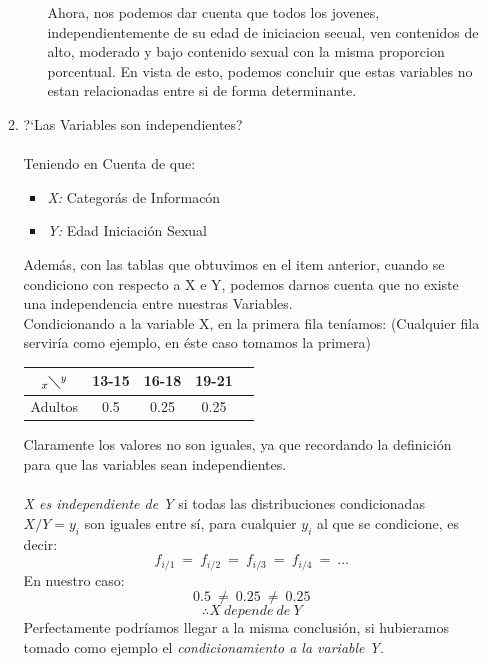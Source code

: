 \documentclass[letterpaper,spanish,11pt]{article}
\begin{document}
\begin{itemize}
\begin{enumerate}
\begin{enumerate}
Ahora, nos podemos dar cuenta que todos los jovenes, independientemente de su edad de iniciacion secual, ven contenidos de alto, moderado y bajo contenido sexual con la misma proporcion porcentual. En vista de esto, podemos concluir que estas variables no estan relacionadas entre si de forma determinante.\\ 

\end{enumerate}
\item ?`Las Variables son independientes?\\\\
	Teniendo en Cuenta de que:\\
	\begin{itemize}
		\item \emph{X:} Categor\'as de Informac\'on
		\item \emph{Y:} Edad Iniciaci\'on Sexual
	\end{itemize}
	Adem\'as, con las tablas que obtuvimos en el item anterior, cuando se condiciono con respecto a X e Y, podemos darnos
	cuenta que no existe una independencia entre nuestras Variables.\\
		Condicionando a la variable X, en la primera fila ten\'iamos: (Cualquier fila servir\'ia como ejemplo, en \'este caso tomamos la primera)\\
		\begin{center}
			\begin{tabular}[c]{|c|c c c|c|}                           	
	                \hline
	                $_x\diagdown ^{y}$ & 13-15 & 16-18 & 19-21 \\
		        \hline
	                Adultos & 0.5 & 0.25 & 0.25 \\
			\hline
	                \end{tabular}
		\end{center}
	Claramente los valores no son iguales, ya que recordando la definici\'on para que las variables sean independientes.\\\\
	\emph{X es independiente de Y} si todas las distribuciones condicionadas $X/Y = y_{i}$ son iguales
	entre s\'i, para cualquier $y_{i}$ al que se condicione, es decir:\\
	$$f_{i/1}\ =\ f_{i/2}\ =\ f_{i/3}\ =\ f_{i/4}\ =\ \ldots$$
	En nuestro caso:
	$$0.5\ \neq\ 0.25\ \neq\ 0.25$$
	$$\therefore X\ depende\ de\ Y$$
	Perfectamente podr\'iamos llegar  a la misma conclusi\'on, si hubieramos tomado como ejemplo el \emph{condicionamiento a la variable Y}.


\end{enumerate}
\end{itemize}
\end{document}
